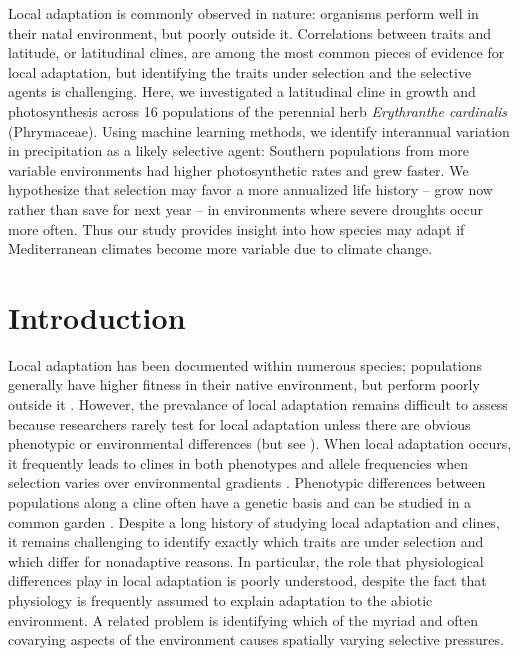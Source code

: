 \documentclass[11pt, oneside]{article}
\begin{document}
Local adaptation is commonly observed in nature: organisms perform well in their natal environment, but poorly outside it. Correlations between traits and latitude, or latitudinal clines, are among the most common pieces of evidence for local adaptation, but identifying the traits under selection and the selective agents is challenging. Here, we investigated a latitudinal cline in growth and photosynthesis across 16 populations of the perennial herb \textit{Erythranthe cardinalis} (Phrymaceae). Using machine learning methods, we identify interannual variation in precipitation as a likely selective agent: Southern populations from more variable environments had higher photosynthetic rates and grew faster. We hypothesize that selection may favor a more annualized life history -- grow now rather than save for next year -- in environments where severe droughts occur more often. Thus our study provides insight into how species may adapt if Mediterranean climates become more variable due to climate change.

\section*{Introduction}

\linenumbers

Local adaptation has been documented within numerous species; populations generally have higher fitness in their native environment, but perform poorly outside it \citep{Schluter_2000, Leimu_Fischer_2008, Hereford_2009}. However, the prevalance of local adaptation remains difficult to assess because researchers rarely test for local adaptation unless there are obvious phenotypic or environmental differences (but see \citeauthor{Hereford_Winn_2008} \citeyear{Hereford_Winn_2008}). When local adaptation occurs, it frequently leads to clines in both phenotypes and allele frequencies when selection varies over environmental gradients \citep{Huxley_1938, Endler_1977, Barton_1999}. Phenotypic differences between populations along a cline often have a genetic basis and can be studied in a common garden \citep{Turesson_1922, Clausen_etal_1940, Hiesey_etal_1942}. Despite a long history of studying local adaptation and clines, it remains challenging to identify exactly which traits are under selection and which differ for nonadaptive reasons. In particular, the role that physiological differences play in local adaptation is poorly understood, despite the fact that physiology is frequently assumed to explain adaptation to the abiotic environment. A related problem is identifying which of the myriad and often covarying aspects of the environment causes spatially varying selective pressures. 
\end{document}
